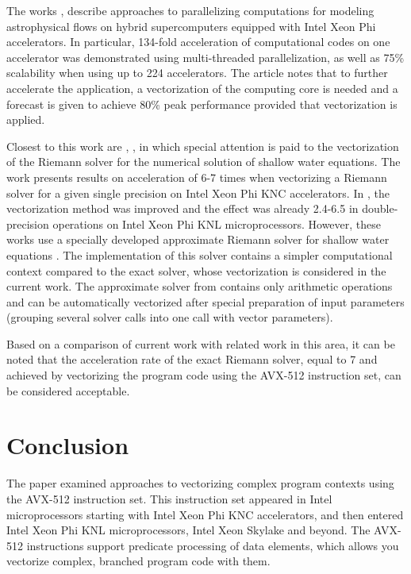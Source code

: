 \documentclass[utf8,english]{psta}%
\begin{document}
The works \cite{Kulikov}, \cite{Kulikov2} describe approaches to parallelizing computations for modeling astrophysical flows on hybrid supercomputers equipped with Intel Xeon Phi accelerators.
In particular, 134-fold acceleration of computational codes on one accelerator was demonstrated using multi-threaded parallelization, as well as 75\% scalability when using up to 224 accelerators.
The article notes that to further accelerate the application, a vectorization of the computing core is needed and a forecast is given to achieve 80\% peak performance provided that vectorization is applied.

Closest to this work are \cite{BaderSWEVect}, \cite{FerreiraSWEVect}, in which special attention is paid to the vectorization of the Riemann solver for the numerical solution of shallow water equations.
The work \cite{BaderSWEVect} presents results on acceleration of 6-7 times when vectorizing a Riemann solver for a given single precision on Intel Xeon Phi KNC accelerators.
In \cite{FerreiraSWEVect}, the vectorization method was improved and the effect was already 2.4-6.5 in double-precision operations on Intel Xeon Phi KNL microprocessors.
However, these works use a specially developed approximate Riemann solver for shallow water equations \cite{George}.
The implementation of this solver contains a simpler computational context compared to the exact solver, whose vectorization is considered in the current work.
The approximate solver from \cite{George} contains only arithmetic operations and can be automatically vectorized after special preparation of input parameters (grouping several solver calls into one call with vector parameters).

Based on a comparison of current work with related work in this area, it can be noted that the acceleration rate of the exact Riemann solver, equal to 7 and achieved by vectorizing the program code using the AVX-512 instruction set, can be considered acceptable.

\section*{Conclusion}

The paper examined approaches to vectorizing complex program contexts using the AVX-512 instruction set.
This instruction set appeared in Intel microprocessors starting with Intel Xeon Phi KNC accelerators, and then entered Intel Xeon Phi KNL microprocessors, Intel Xeon Skylake and beyond.
The AVX-512 instructions support predicate processing of data elements, which allows you vectorize complex, branched program code with them.
\end{document}
